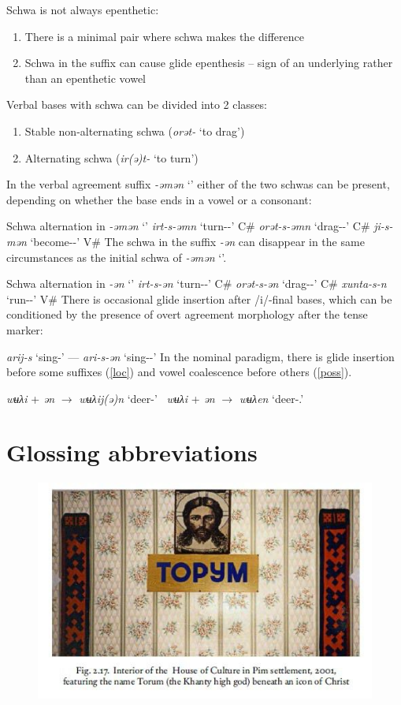 \documentclass[a4paper, 12pt]{article}
\begin{document}
	Schwa is not always epenthetic:
	
\begin{enumerate}[$\gg$]
	\item There is a minimal pair where schwa makes the difference
	\item Schwa in the suffix can cause glide epenthesis -- sign of an underlying rather than an epenthetic vowel
\end{enumerate}
	Verbal bases with schwa can be divided into 2 classes:
	
\begin{enumerate}[$\gg$]
	\item Stable non-alternating schwa (\emph{orət-} `to drag')
	\item Alternating schwa (\emph{ir(ə)t-} `to turn')
\end{enumerate}
	In the verbal agreement suffix \emph{-əmən} `{\Fdu}' either of the two schwas can be present, depending on whether the base ends in a vowel or a consonant:
	
	\pex Schwa alternation in \emph{-əmən} `{\Fdu}'
		\a \emph{irt-s-əmn} `turn-{\Pst}-{\Fdu}' \hfill C\#
		\a \emph{orət-s-əmn} `drag-{\Pst}-{\Fdu}' \hfill C\#
		\a \emph{ji-s-mən} `become-{\Pst}-{\Fdu}' \hfill V\#
	\xe
	The schwa in the {\Ssg} suffix \emph{-ən} can disappear in the same circumstances as the initial schwa of \emph{-əmən} `{\Fdu}'.
	
	\pex Schwa alternation in \emph{-ən} `{\Ssg}'
		\a \emph{irt-s-ən} `turn-{\Pst}-{\Fdu}' \hfill C\#
		\a \emph{orət-s-ən} `drag-{\Pst}-{\Fdu}' \hfill C\#
		\a \emph{xunta-s-n} `run-{\Pst}-{\Fdu}' \hfill V\#
	\xe
	There is occasional glide insertion after /i/-final bases, which can be conditioned by the presence of overt agreement morphology after the tense marker:
	
\ex\emph{arij-s} `sing-{\Pst}' --- \emph{ari-s-ən} `sing-{\Pst}-{\Ssg}'
\xe
	In the nominal paradigm, there is glide insertion before some suffixes (\ref{loc}) and vowel coalescence before others (\ref{poss}).
	
	\ex\label{loc}\emph{wʉλi} + \emph{ən} $\rightarrow$ \emph{wʉλij(ə)n} `deer-{\Loc}' \xe
	\ex~\label{poss}\emph{wʉλi} + \emph{ən} $\rightarrow$ \emph{wʉλen} `deer-{\Poss}.{\Spl}' \xe
	

	\section*{Glossing abbreviations}
	
\printglossaries
	
\printbibliography

	\begin{figure}[H]
		\centering
		\includegraphics[scale=.66]{end}
	\end{figure}
\end{document}
